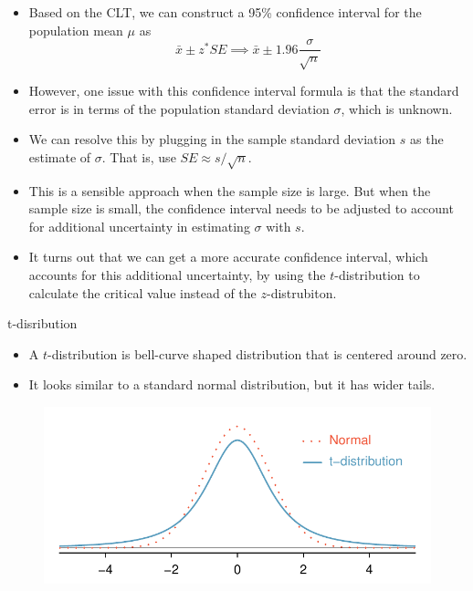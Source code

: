 \documentclass[fleqn, 10pt]{beamer}\usepackage[]{graphicx}\usepackage[]{color}
\begin{document}
\begin{frame}
\begin{itemize}
\item Based on the CLT, we can construct a 95\% confidence interval for the population mean $\mu$ as
$$\bar{x} \pm z^* SE \implies \bar{x} \pm 1.96 \frac{\sigma}{\sqrt{n}}$$
\item However, one issue with this confidence interval formula is that the standard error is in terms of the population standard deviation $\sigma$, which is unknown.
\item We can resolve this by plugging in the sample standard deviation $s$ as the estimate of $\sigma$.  That is, use $SE \approx s / \sqrt{n}$.  
\item This is a sensible approach when the sample size is large.  But when the sample size is small, the confidence interval needs to be adjusted to account for additional uncertainty in estimating $\sigma$ with $s$. 
\item It turns out that we can get a more accurate confidence interval, which accounts for this additional uncertainty, by using the $t$-distribution to calculate the critical value instead of the $z$-distrubiton.
\end{itemize}
\end{frame}

\begin{frame}{t-disribution}
\begin{itemize}
\item A $t$-distribution is bell-curve shaped distribution that is centered around zero.
\vspace{5pt}
\item It looks similar to a standard normal distribution, but it has wider tails.
\end{itemize}
\begin{figure}
\includegraphics[scale = 0.6]{figure/tDistCompareToNormalDist.pdf}
\end{figure}
\end{frame}
\end{document}
